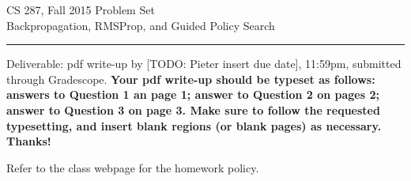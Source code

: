 \documentclass{article}
\newcommand{\ruleskip}{\bigskip\hrule\bigskip}
\begin{document}
\pagestyle{myheadings} 




{\huge
\noindent CS 287, Fall 2015
Problem Set \\
 Backpropagation, RMSProp, and Guided Policy Search}


\ruleskip
Deliverable:  pdf write-up by [TODO: Pieter insert due date], 11:59pm,
submitted through Gradescope.   {\bf Your pdf write-up should be
  typeset as follows: answers to Question 1
  an page 1; answer to Question 2 on pages 2;  answer to
  Question 3 on page 3.   Make sure to
  follow the requested typesetting, and insert blank regions (or blank pages) as necessary.  Thanks!}









\vspace{.07in} Refer to the class webpage for the
homework policy.

\end{document}

